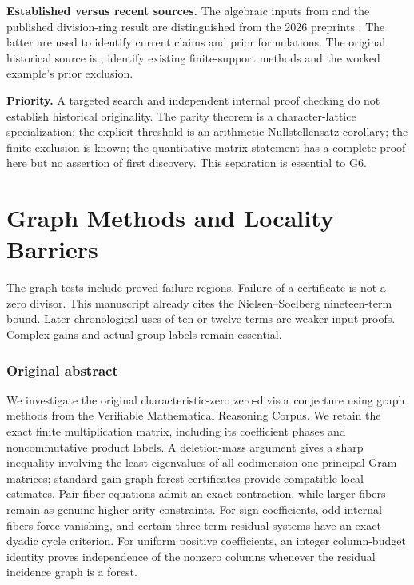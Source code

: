 \documentclass[11pt,a4paper,oneside]{report}
\theoremstyle{definition}
\theoremstyle{remark}
\newcommand{\compilationnote}[1]{\medskip\noindent{\small\color{accent}\textbf{Compilation note --- 23 November 2026.}}\par
{\small #1}\par\medskip}
\begin{document}
\textbf{Established versus recent sources.} The algebraic inputs from
\cite{B:ES,B:KPS} and the published division-ring result \cite{B:FSP} are
distinguished from the 2026 preprints \cite{B:Ivanov,B:MD}. The latter are
used to identify current claims and prior formulations. The original
historical source is \cite{B:Kaplansky}; \cite{B:NS,B:Schweitzer} identify
existing finite-support methods and the worked example's prior exclusion.

\textbf{Priority.} A targeted search and independent internal proof
checking do not establish historical originality. The parity theorem is
a character-lattice specialization; the explicit threshold is an
arithmetic-Nullstellensatz corollary; the finite exclusion is known;
the quantitative matrix statement has a complete proof here but no
assertion of first discovery. This separation is essential to G6.



\chapter{Graph Methods and Locality Barriers}\label{chap:M02}
\par
\compilationnote{The graph tests include proved failure regions. Failure of a
certificate is not a zero divisor. This manuscript already cites the
Nielsen--Soelberg nineteen-term bound. Later chronological uses of ten or
twelve terms are weaker-input proofs. Complex gains and actual group labels
remain essential.}
\subsection*{Original abstract}
We investigate the original characteristic-zero zero-divisor conjecture using graph methods from the Verifiable Mathematical Reasoning Corpus. We retain the exact finite multiplication matrix, including its coefficient phases and noncommutative product labels. A deletion-mass argument gives a sharp inequality involving the least eigenvalues of all codimension-one principal Gram matrices; standard gain-graph forest certificates provide compatible local estimates. Pair-fiber equations admit an exact contraction, while larger fibers remain as genuine higher-arity constraints. For sign coefficients, odd internal fibers force vanishing, and certain three-term residual systems have an exact dyadic cycle criterion. For uniform positive coefficients, an integer column-budget identity proves independence of the nonzero columns whenever the residual incidence graph is a forest.
\end{document}
